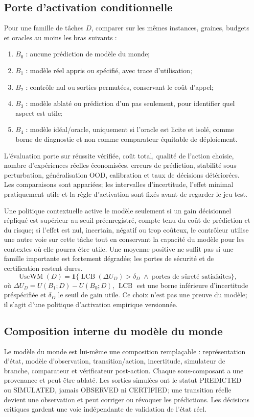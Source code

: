 \documentclass[11pt,a4paper]{article}
\newcommand{\kw}[1]{\textsf{#1}}
\theoremstyle{definition}
\theoremstyle{plain}
\theoremstyle{remark}
\begin{document}
\subsection{Porte d'activation conditionnelle}
Pour une famille de tâches \(D\), comparer sur les mêmes instances, graines, budgets et oracles au moins les bras suivants :
\begin{enumerate}
\item \(B_0\) : aucune prédiction de modèle du monde;
\item \(B_1\) : modèle réel appris ou spécifié, avec trace d'utilisation;
\item \(B_2\) : contrôle nul ou sorties permutées, conservant le coût d'appel;
\item \(B_3\) : modèle ablaté ou prédiction d'un pas seulement, pour identifier quel aspect est utile;
\item \(B_4\) : modèle idéal/oracle, uniquement si l'oracle est licite et isolé, comme borne de diagnostic et non comme comparateur équitable de déploiement.
\end{enumerate}
L'évaluation porte sur réussite vérifiée, coût total, qualité de l'action choisie, nombre d'expériences réelles économisées, erreurs de prédiction, stabilité sous perturbation, généralisation OOD, calibration et taux de décisions détériorées. Les comparaisons sont appariées; les intervalles d'incertitude, l'effet minimal pratiquement utile et la règle d'activation sont fixés avant de regarder le jeu test.

Une politique contextuelle active le modèle seulement si un gain décisionnel répliqué est supérieur au seuil préenregistré, compte tenu du coût de prédiction et du risque; si l'effet est nul, incertain, négatif ou trop coûteux, le contrôleur utilise une autre voie sur cette tâche tout en conservant la capacité du modèle pour les contextes où elle pourra être utile. Une moyenne positive ne suffit pas si une famille importante est fortement dégradée; les portes de sécurité et de certification restent dures.
\[
\operatorname{UseWM}(D)=\mathbf{1}\{\operatorname{LCB}(\Delta U_D)>\delta_D\;\land\;\text{portes de sûreté satisfaites}\},
\]
où \(\Delta U_D=U(B_1;D)-U(B_0;D)\), \(\operatorname{LCB}\) est une borne inférieure d'incertitude préspécifiée et \(\delta_D\) le seuil de gain utile. Ce choix n'est pas une preuve du modèle; il s'agit d'une politique d'activation empirique versionnée.

\subsection{Composition interne du modèle du monde}
Le modèle du monde est lui-même une composition remplaçable : représentation d'état, modèle d'observation, transition/action, incertitude, simulateur de branche, comparateur et vérificateur post-action. Chaque sous-composant a une provenance et peut être ablaté. Les sorties simulées ont le statut \kw{PREDICTED} ou \kw{SIMULATED}, jamais \kw{OBSERVED} ni \kw{CERTIFIED}; une transition réelle devient une observation et peut corriger ou révoquer les prédictions. Les décisions critiques gardent une voie indépendante de validation de l'état réel.
\end{document}
